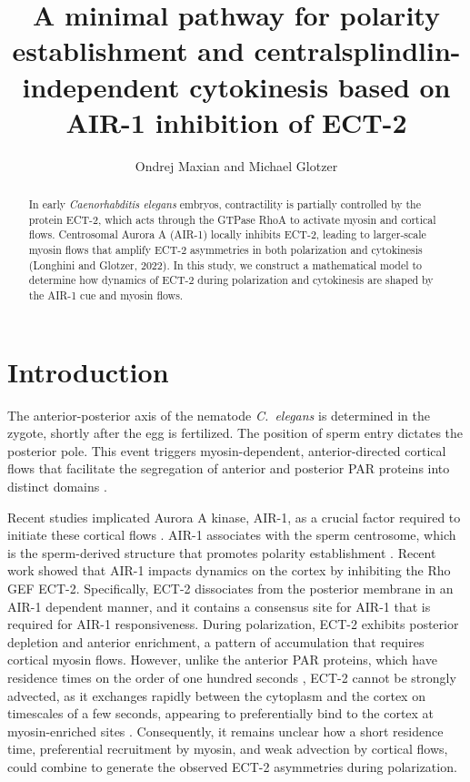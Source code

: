 \documentclass[11pt]{article}
\title{A minimal pathway for polarity establishment and centralsplindlin-independent cytokinesis based on AIR-1 inhibition of ECT-2 \vspace{-0.5 cm}}
\author{Ondrej Maxian and Michael Glotzer \vspace{-0.75 cm}}
\begin{document}
\maketitle

\begin{abstract}
In early \emph{Caenorhabditis elegans} embryos, contractility is partially controlled by the protein ECT-2, which acts through the GTPase RhoA to activate myosin and cortical flows. Centrosomal Aurora A (AIR-1) locally inhibits ECT-2, leading to larger-scale myosin flows that amplify ECT-2 asymmetries in both polarization and cytokinesis (Longhini and Glotzer, 2022). In this study, we construct a mathematical model to determine how dynamics of ECT-2 during polarization and cytokinesis are shaped by the AIR-1 cue and myosin flows. 
\end{abstract}

\section{Introduction}
The anterior-posterior axis of the nematode \emph{C.\ elegans} is determined in the zygote, shortly after the egg is fertilized.  The position of sperm entry dictates the posterior pole. This event triggers myosin-dependent, anterior-directed cortical flows that facilitate the segregation of anterior and posterior PAR proteins into distinct domains \citep{munro2004cortical, lang2017proteins, gross2019guiding}.

Recent studies implicated Aurora A kinase, AIR-1, as a crucial factor required to initiate these cortical flows \citep{klinkert2019aurora,kapoor2019centrosome, longhini2022aurora}. AIR-1 associates with the sperm centrosome, which is the sperm-derived structure that promotes polarity establishment \citep{hannak2001aurora}. Recent work \citep{longhini2022aurora} showed that AIR-1 impacts dynamics on the cortex by inhibiting the Rho GEF ECT-2. Specifically, ECT-2 dissociates from the posterior membrane in an AIR-1 dependent manner, and it contains a consensus site for AIR-1 that is required for AIR-1 responsiveness. During polarization, ECT-2 exhibits posterior depletion and anterior enrichment, a pattern of accumulation that requires cortical myosin flows. However, unlike the anterior PAR proteins, which have residence times on the order of one hundred seconds \citep{robin2014single}, ECT-2 cannot be strongly advected, as it exchanges rapidly between the cytoplasm and the cortex on timescales of a few seconds, appearing to preferentially bind to the cortex at myosin-enriched sites \citep{longhini2022aurora}. Consequently, it remains unclear how a short residence time, preferential recruitment by myosin, and weak advection by cortical flows, could combine to generate the observed ECT-2 asymmetries during polarization. 
\end{document}
